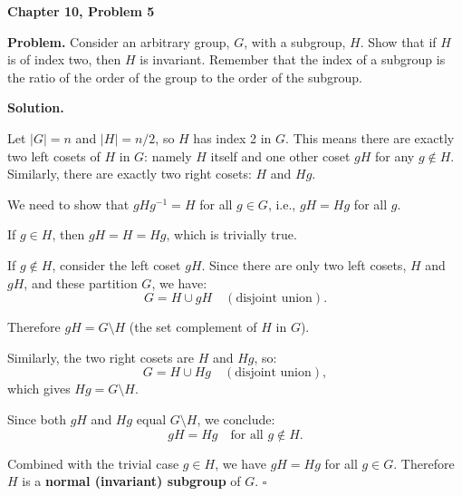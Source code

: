 \documentclass[12pt]{article}
\begin{document}
\begin{center}
{\Large\bfseries Chapter 10, Problem 5}
\end{center}

\noindent\textbf{Problem.} Consider an arbitrary group, $G$, with a subgroup, $H$. Show that if $H$ is of index two, then $H$ is invariant. Remember that the index of a subgroup is the ratio of the order of the group to the order of the subgroup.

\bigskip
\noindent\textbf{Solution.}

Let $|G| = n$ and $|H| = n/2$, so $H$ has index 2 in $G$. This means there are exactly two left cosets of $H$ in $G$: namely $H$ itself and one other coset $gH$ for any $g \notin H$. Similarly, there are exactly two right cosets: $H$ and $Hg$.

We need to show that $gHg^{-1} = H$ for all $g \in G$, i.e., $gH = Hg$ for all $g$.

If $g \in H$, then $gH = H = Hg$, which is trivially true.

If $g \notin H$, consider the left coset $gH$. Since there are only two left cosets, $H$ and $gH$, and these partition $G$, we have:
\[
G = H \cup gH \quad (\text{disjoint union}).
\]

Therefore $gH = G \setminus H$ (the set complement of $H$ in $G$).

Similarly, the two right cosets are $H$ and $Hg$, so:
\[
G = H \cup Hg \quad (\text{disjoint union}),
\]
which gives $Hg = G \setminus H$.

Since both $gH$ and $Hg$ equal $G \setminus H$, we conclude:
\[
gH = Hg \quad \text{for all } g \notin H.
\]

Combined with the trivial case $g \in H$, we have $gH = Hg$ for all $g \in G$. Therefore $H$ is a \textbf{normal (invariant) subgroup} of $G$. $\square$
\end{document}
